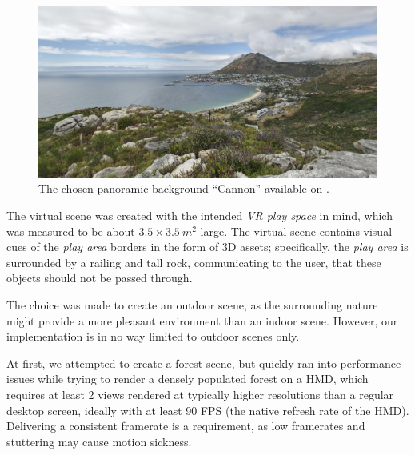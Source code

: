 \begin{figure}[H]
    \centering
    \ifgraphics
        \includegraphics[width=\textwidth]{img/cannon.png}
    \fi
    \caption{The chosen panoramic background ``Cannon'' available on .}\label{fig:cannon}
\end{figure}

The virtual scene was created with the intended \textit{\ac{VR} play space} in mind, which was measured to be about $3.5\times3.5 \:\si{m^2}$ large. The virtual scene contains visual cues of the \textit{play area} borders in the form of 3D assets; specifically, the \textit{play area} is surrounded by a railing and tall rock, communicating to the user, that these objects should not be passed through.

The choice was made to create an outdoor scene, as the surrounding nature might provide a more pleasant environment than an indoor scene. However, our implementation is in no way limited to outdoor scenes only.

At first, we attempted to create a forest scene, but quickly ran into performance issues while trying to render a densely populated forest on a \ac{HMD}, which requires at least 2 views rendered at typically higher resolutions than a regular desktop screen, ideally with at least 90 \acs{FPS} (the native refresh rate of the \ac{HMD}). Delivering a consistent framerate is a requirement, as low framerates and stuttering may cause motion sickness.

